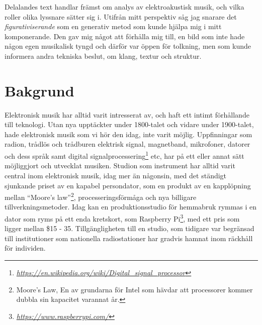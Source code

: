 \documentclass{article}
\begin{document}
Delalandes text handlar främst om analys av elektroakustisk musik, och vilka roller olika lyssnare sätter sig
i. Utifrån mitt perspektiv såg jag snarare det \emph{figurativiserande} som en generativ metod som kunde
hjälpa mig i mitt komponerande. Den gav mig något att förhålla mig till, en bild som inte hade någon egen
musikalisk tyngd och därför var öppen för tolkning, men som kunde informera andra tekniska beslut, om klang,
textur och struktur.





\section{Bakgrund}
Elektronisk musik har alltid varit intresserat av, och haft ett intimt förhållande till teknologi. Utan nya
upptäckter under 1800-talet och vidare under 1900-talet, hade elektronisk musik som vi hör den idag, inte
varit möjlig. Uppfinningar som radion, trådlös och trådburen elektrisk signal, magnetband,
mikrofoner, datorer och dess språk samt digital
signalprocessering\footnote{\emph{\url{https://en.wikipedia.org/wiki/Digital\_signal\_processor}}} etc, har på ett eller
annat sätt möjliggjort och utvecklat musiken. Studion som instrument
har alltid varit central inom elektronisk musik, idag mer än någonsin, med
det ständigt sjunkande priset av en kapabel persondator, som en produkt av en kapplöpning mellan ``Moore's
law''\footnote{Moore's Law, En av grundarna för Intel som hävdar att processorer kommer dubbla sin kapacitet
varannat år.}, processeringsförmåga och nya billigare tillverkningsmetoder. Idag kan en produktionsstudio för
hemmabruk rymmas i en dator som ryms på ett enda kretskort, som Raspberry Pi\footnote{
\emph{\url{https://www.raspberrypi.com/}}}, med ett pris som ligger mellan \$15 - 35. Tillgängligheten till en studio,
som tidigare var begränsad till institutioner som nationella radiostationer har gradvis hamnat inom räckhåll
för individen.
\end{document}
